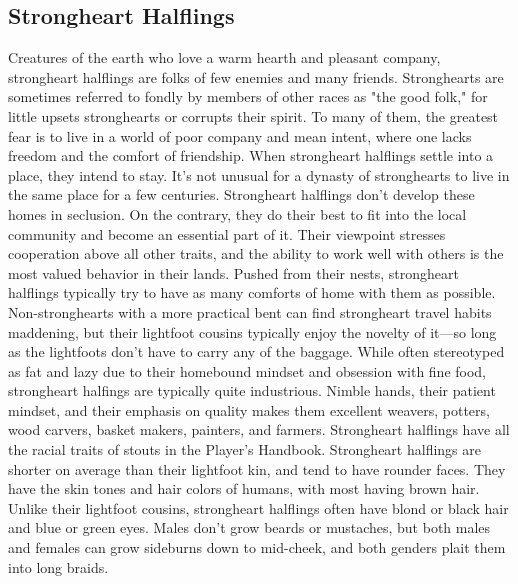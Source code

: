 \documentclass[10pt,a4paper,twoside,twocolumn,openany,bg=print,nodeprecatedcode]{dndbook}
\begin{document}
\subsection{Strongheart Halflings}
Creatures of the earth who love a warm hearth and pleasant company, strongheart halflings are folks of few enemies and many friends. Stronghearts are sometimes referred to fondly by members of other races as "the good folk," for little upsets stronghearts or corrupts their spirit. To many of them, the greatest fear is to live in a world of poor company and mean intent, where one lacks freedom and the comfort of friendship.
When strongheart halflings settle into a place, they intend to stay. It's not unusual for a dynasty of stronghearts to live in the same place for a few centuries. Strongheart halflings don't develop these homes in seclusion. On the contrary, they do their best to fit into the local community and become an essential part of it. Their viewpoint stresses cooperation above all other traits, and the ability to work well with others is the most valued behavior in their lands.
Pushed from their nests, strongheart halflings typically try to have as many comforts of home with them as possible. Non-stronghearts with a more practical bent can find strongheart travel habits maddening, but their lightfoot cousins typically enjoy the novelty of it—so long as the lightfoots don't have to carry any of the baggage.
While often stereotyped as fat and lazy due to their homebound mindset and obsession with fine food, strongheart halfings are typically quite industrious. Nimble hands, their patient mindset, and their emphasis on quality makes them excellent weavers, potters, wood carvers, basket makers, painters, and farmers.
Strongheart halflings have all the racial traits of stouts in the Player's Handbook. Strongheart halflings are shorter on average than their lightfoot kin, and tend to have rounder faces. They have the skin tones and hair colors of humans, with most having brown hair. Unlike their lightfoot cousins, strongheart halflings often have blond or black hair and blue or green eyes. Males don't grow beards or mustaches, but both males and females can grow sideburns down to mid-cheek, and both genders plait them into long braids.
\end{document}
